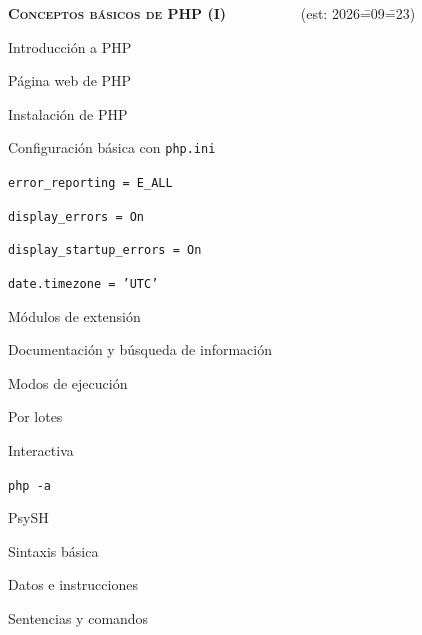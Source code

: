 \begin{longenum}
\begin{longenum}
\begin{longenum}
\begin{longenum}
            \end{longenum}
        \end{longenum}
    \end{longenum}
    \item \textbf{\textsc{Conceptos básicos de PHP (I)}} \ \ \ \ \ \ \ \ \ \ (est: 2026\==09\==23)
    \begin{longenum}
        \item Introducción a PHP
        \begin{longenum}
            \item Página web de PHP
            \item Instalación de PHP
            \item Configuración básica con \texttt{php.ini}
            \begin{longenum}
                \item \texttt{error\_reporting = E\_ALL}
                \item \texttt{display\_errors = On}
                \item \texttt{display\_startup\_errors = On}
                \item \texttt{date.timezone = 'UTC'}
            \end{longenum}
            \item Módulos de extensión
            \item Documentación y búsqueda de información
            \item Modos de ejecución \opcional\
            \begin{longenum}
                \item Por lotes
                \item Interactiva
                \begin{longenum}
                    \item \texttt{php -a}
                    \item PsySH
                \end{longenum}
            \end{longenum}
        \end{longenum}
        \item Sintaxis básica
        \begin{longenum}
            \item Datos e instrucciones
            \item Sentencias y comandos
            \begin{longenum}

\end{longenum}
\end{longenum}
\end{longenum}
\end{longenum}
